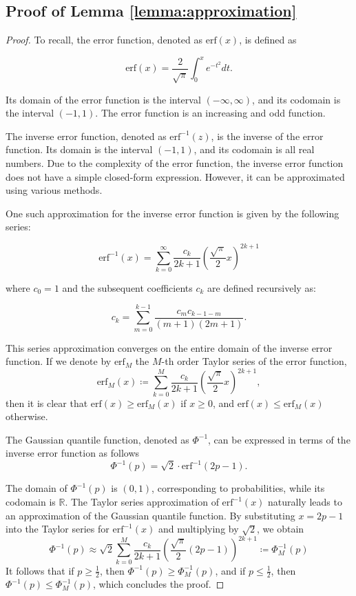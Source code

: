\subsection{Proof of Lemma \ref{lemma:approximation}}\label{subsec:proof-of-lemma-ref{lemma:approximation}}
\begin{proof}
    To recall, the error function, denoted as $\text{erf}(x)$, is defined as

    \[
        \text{erf}(x) = \frac{2}{\sqrt{\pi}} \int_0^x e^{-t^2} dt.
    \]

    Its domain of the error function is the interval $(-\infty, \infty)$, and its codomain is the interval $(-1, 1)$.
    The error function is an increasing and odd function.

    The inverse error function, denoted as $\text{erf}^{-1}(z)$, is the inverse of the error function.
    Its domain is the interval $(-1, 1)$, and its codomain is all real numbers.
    Due to the complexity of the error function, the inverse error function does not have a simple closed-form expression.
    However, it can be approximated using various methods.

    One such approximation for the inverse error function is given by the following series:

    \[
        \text{erf}^{-1}(x) = \sum_{k=0}^{\infty} \frac{c_k}{2k+1} \left(\frac{\sqrt{\pi}}{2}x\right)^{2k+1}
    \]

    where $c_0 = 1$ and the subsequent coefficients $c_k$ are defined recursively as:

    \[
        c_k = \sum_{m=0}^{k-1} \frac{c_m c_{k-1-m}}{(m+1)(2m+1)}.
    \]

    This series approximation converges on the entire domain of the inverse error function.
    If we denote by $\text{erf}_M$ the $M$-th order Taylor series of the error function,
    \[
        \text{erf}_M(x) \coloneqq \sum_{k=0}^M \frac{c_k}{2k+1} \left(\frac{\sqrt{\pi}}{2}x\right)^{2k+1},
    \]
    then it is clear that $\text{erf}(x) \geq\text{erf}_M(x)$ if $x\geq0$, and $\text{erf}(x) \leq\text{erf}_M(x)$ otherwise.

    The Gaussian quantile function, denoted as $\Phi^{-1}$, can be expressed in terms of the inverse error function as follows
    \[\Phi^{-1}(p) = \sqrt{2} \cdot \text{erf}^{-1}(2p - 1).\]

    The domain of $\Phi^{-1}(p)$ is $(0, 1)$, corresponding to probabilities, while its codomain is $\mathbb{R}$.
    The Taylor series approximation of $\text{erf}^{-1}(x)$ naturally leads to an approximation of the Gaussian quantile function.
    By substituting $x = 2p - 1$ into the Taylor series for $\text{erf}^{-1}(x)$ and multiplying by $\sqrt{2}$, we obtain
    \[\Phi^{-1}(p) \approx \sqrt{2} \sum_{k=0}^{M} \frac{c_k}{2k+1} \left(\frac{\sqrt{\pi}}{2}(2p-1)\right)^{2k+1}\coloneqq\Phi^{-1}_M(p)\]
    It follows that if $p\geq\frac{1}{2}$, then $\Phi^{-1}(p) \geq\Phi^{-1}_M(p)$, and if $p\leq\frac{1}{2}$, then $\Phi^{-1}(p) \leq\Phi^{-1}_M(p)$, which concludes the proof.
\end{proof}